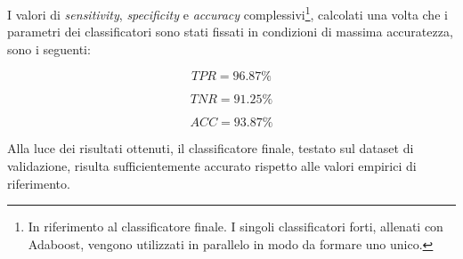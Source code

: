                 I valori di \emph{sensitivity}, \emph{specificity} e \emph{accuracy} complessivi\footnote{In riferimento al classificatore finale. I singoli classificatori forti, allenati con Adaboost, vengono utilizzati in parallelo in modo da formare uno unico.}, calcolati una volta che i parametri dei classificatori sono stati fissati in condizioni di massima accuratezza, sono i seguenti:

                \begin{equation}
                    \label{eq:sensitivity_value}
                    TPR = 96.87\%
                \end{equation}

                \begin{equation}
                    \label{eq:specificity_value}
                    TNR = 91.25\%
                \end{equation}

                \begin{equation}
                    \label{eq:accuracy_value}
                    ACC = 93.87\%
                \end{equation}

                Alla luce dei risultati ottenuti, il classificatore finale, testato sul dataset di validazione, risulta sufficientemente accurato rispetto alle valori empirici di riferimento.

